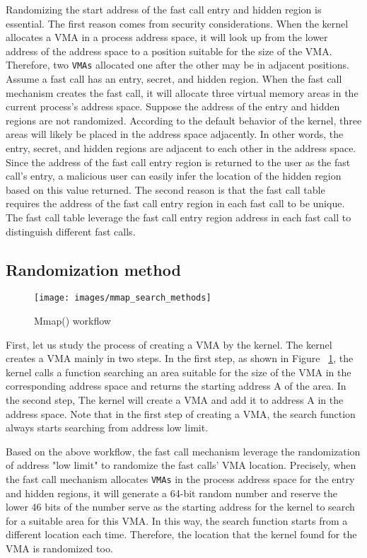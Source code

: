 Randomizing the start address of the fast call entry and hidden region is essential.
The first reason comes from security considerations. When the kernel allocates a 
VMA in a process address space, it will look up from the lower address of the address 
space to a position suitable for the size of the VMA. Therefore, two \verb|VMAs| 
allocated one after the other may be in adjacent positions. Assume a fast 
call has an entry, secret, and hidden region. When the fast call mechanism 
creates the fast call, it will allocate three virtual memory areas in the current 
process's address space. Suppose the address of the entry and hidden regions are 
not randomized. According to the default behavior of the kernel, three areas will 
likely be placed in the address space adjacently. In other words, the entry, secret,
and hidden regions are adjacent to each other in the address space. Since the address 
of the fast call entry region is returned to the user as the fast call's entry, 
a malicious user can easily infer the location of the hidden region based on this value returned.
The second reason is that the fast call table requires the address of the 
fast call entry region in each fast call to be unique. The fast call table 
leverage the fast call entry region address in each fast call to distinguish
different fast calls.

\subsection{Randomization method}
\begin{figure}[tbp]
  \centering
  \texttt{[image: images/mmap\_search\_methods]}
  \caption[Short description]{Mmap() workflow}
  \label{fig:mmap_search_methods}
\end{figure}

First, let us study the process of creating a VMA by the kernel. 
The kernel creates a VMA mainly in two steps. In the first step, as shown in Figure ~\ref{fig:mmap_search_methods}, the kernel calls 
a function searching an area suitable for the size of the VMA  in the corresponding 
address space and returns the starting address A of the area. In the second step, 
The kernel will create a VMA and add it to address A in the address space.  
Note that in the first step of creating a VMA, the search 
function always starts searching from address low limit.

Based on the above workflow, the fast call mechanism leverage the randomization 
of address "low limit" to randomize the fast calls' VMA location. Precisely,  
when the fast call mechanism allocates \verb|VMAs| in the process address space for 
the entry and hidden regions, it will generate a 64-bit random number and 
reserve the lower 46  bits of the number serve as the starting address for 
the kernel to search for a suitable area for this VMA. In this way, the search 
function starts from a different location each time. Therefore,  the location 
that the kernel found for the VMA is randomized too. 

